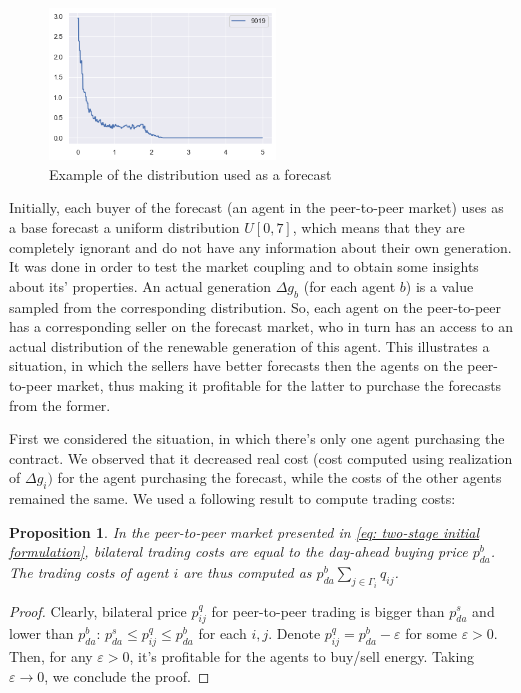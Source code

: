 \documentclass{article}
\newtheorem{proposition}{Proposition}
\begin{document}
\begin{figure}
    \includegraphics[width = 60mm]{res_dist.png}
    \caption{Example of the distribution used as a forecast}
    \label{fig: res_dist}
\end{figure}
Initially, each buyer of the forecast (an agent in the peer-to-peer market) uses as a base forecast a uniform distribution $U[0,7]$, which means that they are completely ignorant and do not have any information about their own generation. It was done in order to test the market coupling and to obtain some insights about its' properties. An actual generation $\Delta g_b$ (for each agent $b$) is a value sampled from the corresponding distribution. So, each agent on the peer-to-peer has a corresponding seller on the forecast market, who in turn has an access to an actual distribution of the renewable generation of this agent. This illustrates a situation, in which the sellers have better forecasts then the agents on the peer-to-peer market, thus making it profitable for the latter to purchase the forecasts from the former. 

First we considered the situation, in which there's only one agent purchasing the contract. We observed that it decreased real cost (cost computed using realization of $\Delta g_i)$ for the agent purchasing the forecast, while the costs of the other agents remained the same.  We used a following result to compute trading costs:
\begin{proposition}\label{proposition: trading costs}
    In the peer-to-peer market presented in \eqref{eq: two-stage initial formulation}, bilateral trading costs are equal to the day-ahead buying price $p^b_{da}$. The trading costs of agent $i$ are thus computed as $p^b_{da} \sum_{j \in \Gamma_i} q_{ij}$.
\end{proposition}
\begin{proof}
    Clearly, bilateral price $p^q_{ij}$ for peer-to-peer trading is bigger than $p^s_{da}$ and lower than $p^b_{da}$: $p^s_{da} \leq p^q_{ij} \leq p^b_{da}$ for each $i,j$. Denote $p^q_{ij} = p^b_{da} - \varepsilon$ for some $\varepsilon > 0$. Then, for any $\varepsilon > 0$, it's profitable for the agents to buy/sell energy. Taking $\varepsilon \rightarrow 0$, we conclude the proof.
\end{proof}
\end{document}
